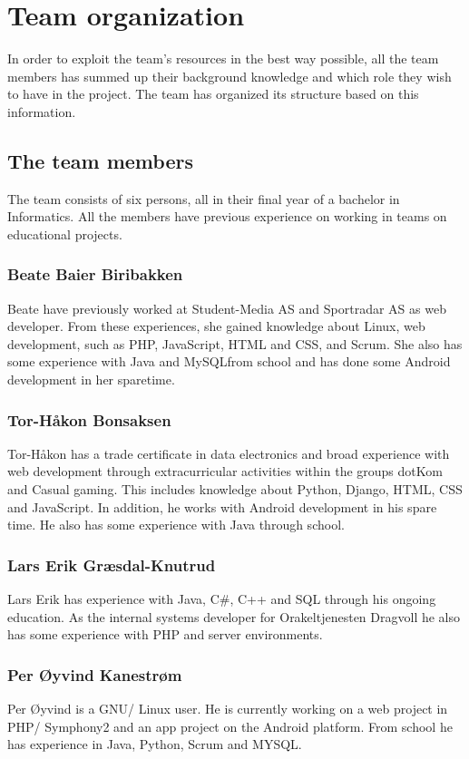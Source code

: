 \section{Team organization}
In order to exploit the team's resources in the best way possible, all the team members has summed up their background knowledge and which role they wish to have in the project. The team has organized its structure based on this information.

\subsection{The team members}
The team consists of six persons, all in their final year of a bachelor in Informatics. All the members have previous experience on working in teams on educational projects.

\subsubsection{Beate Baier Biribakken}
Beate have previously worked at Student-Media AS\cite{studentmedia} and Sportradar AS\cite{sportradar} as web developer. From these experiences, she gained knowledge about Linux, web development, such as PHP, JavaScript, HTML and CSS, and Scrum. She also has some experience with Java and MySQLfrom school and has done some Android development in her sparetime.

\subsubsection{Tor-Håkon Bonsaksen}
Tor-Håkon has a trade certificate in data electronics and broad experience with web development through extracurricular activities within the groups dotKom\cite{dotkom} and Casual gaming\cite{casualgaming}. This includes knowledge about Python, Django, HTML, CSS and JavaScript. In addition, he works with Android development in his spare time. He also has some experience with Java through school.

\subsubsection{Lars Erik Græsdal-Knutrud}
Lars Erik has experience with Java, C\#, C++ and SQL through his ongoing education. As the internal systems developer for Orakeltjenesten Dragvoll\cite{orakeltjenesten} he also has some experience with PHP and server environments. 

\subsubsection{Per Øyvind Kanestrøm}
Per Øyvind is a GNU/ Linux user. He is currently working on a web project in PHP/ Symphony2 and an app project on the Android platform. From school he has experience in Java, Python, Scrum and MYSQL.


